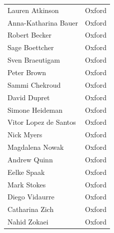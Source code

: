 \documentclass[11pt,a4paper]{article}
\begin{document}
\begin{figure}[H]
\begin{tabularx}{.95\textwidth}{l p{.8\linewidth}}
Lauren Atkinson & Oxford\\
Anna-Katharina Bauer & Oxford\\
Robert Becker & Oxford\\
Sage Boettcher & Oxford\\
Sven Braeutigam & Oxford\\
Peter Brown & Oxford\\
Sammi Chekroud & Oxford\\
David Dupret & Oxford\\
Simone Heideman & Oxford\\
Vitor Lopez de Santos & Oxford\\
Nick Myers & Oxford\\
Magdalena Nowak & Oxford \\
Andrew Quinn & Oxford\\
Eelke Spaak & Oxford\\
Mark Stokes & Oxford\\
Diego Vidaurre & Oxford\\
Catharina Zich & Oxford\\
Nahid Zokaei & Oxford\\
\end{tabularx}
\end{figure}
\restoregeometry
\pagebreak
\end{document}
